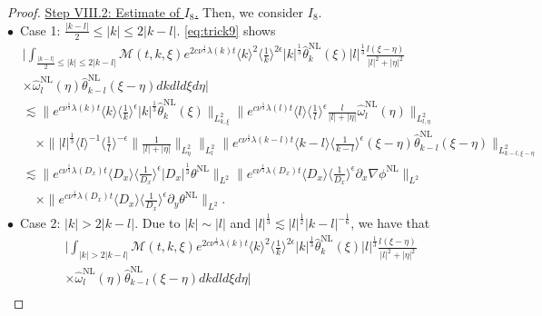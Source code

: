 \documentclass[reqno, 12pt]{amsart} %
\theoremstyle{plain} %
\theoremstyle{definition}
\theoremstyle{remark}
\numberwithin{equation}{section} %
\newcommand{\px}{\partial_x}
\newcommand{\py}{\partial_y}
\begin{document}
\begin{proof}
		\underline{ Step VIII.2: Estimate of $I_8$.} 
		Then,  we consider $I_8$.\\
		$\bullet$~Case 1:   $\frac{|k-l|}{2} \leq |k| \leq 2|k-l|$. \eqref{eq:trick9} shows
		\begin{align*}
			& \bigg| \int_{\frac{|k-l|}{2} \leq |k| \leq 2|k-l|} \mathcal{M}(t, k, \xi) e^{2 c \nu^{\frac{1}{3}} \lambda(k) t}\langle k\rangle^2\langle\frac{1}{k}\rangle^{2 \epsilon} |k|^\frac13\hat{\theta}_k^{\mathrm{NL}}(\xi) |l|^\frac13  \frac{l(\xi - \eta)}{|l|^2+|\eta|^2}  \\
			& \times \hat{\omega}_l^{\mathrm{NL}}(\eta) \hat{\theta}_{k-l}^{\mathrm{NL}}(\xi-\eta) d k d l d \xi d \eta \bigg| \\
			& \lesssim\|e^{c \nu^{\frac{1}{3}} \lambda(k) t}  \langle k \rangle \langle \frac1k \rangle^\epsilon |k|^\frac13  \hat{\theta}_k^{\mathrm{NL}}(\xi)\|_{L_{k, \xi}^2}   \|e^{c \nu^{\frac{1}{3}} \lambda(l) t}\langle l\rangle\langle\frac{1}{l}\rangle^\epsilon \frac l{|l| + |\eta|} \hat{\omega}_l^{\mathrm{NL}}(\eta)\|_{L_{l, \eta}^2}     \\
			& \quad \times \||l|^\frac13 \langle l\rangle^{-1}\langle\frac{1}{l}\rangle^{-\epsilon}\| \frac{1}{|l|+|\eta|}\|_{L_\eta^2}\|_{L_l^2} \|e^{c \nu^{\frac{1}{3}} \lambda(k-l) t}\langle k-l \rangle \langle \frac{1}{k-l} \rangle^\epsilon  (\xi - \eta) \hat{\theta}_{k-l}^{\mathrm{NL}}(\xi-\eta)\|_{L_{k-l, \xi-\eta}^2} \\
			& \lesssim\|e^{c \nu^{\frac{1}{3}} \lambda\left(D_x\right) t}\langle D_x\rangle    \langle \frac{1}{D_x}\rangle^\epsilon  \left|D_x\right|^{\frac{1}{3}} \theta^{\mathrm{NL}}\|_{L^2} \|e^{c \nu^{\frac{1}{3}} \lambda\left(D_x\right) t}\langle D_x\rangle\langle\frac{1}{D_x}\rangle^\epsilon\px \nabla \phi^{\mathrm{NL}}\|_{L^2} \\
			& \quad \times\|e^{c \nu^{\frac{1}{3}} \lambda\left(D_x\right) t}\langle D_x\rangle\langle\frac{1}{D_x}\rangle^\epsilon \py   \theta^{\mathrm{NL}}\|_{L^2}.
		\end{align*}
		$\bullet$~Case 2:   $|k| > 2|k-l| $. Due to $ |k|\sim |l|$ and $|l|^\frac13 \lesssim |l|^\frac12 |k-l|^{-\frac16}$,  we have that
		\begin{align*}
			& \bigg| \int_{|k| > 2|k-l| } \mathcal{M}(t, k, \xi) e^{2 c \nu^{\frac{1}{3}} \lambda(k) t}\langle k\rangle^2\langle\frac{1}{k}\rangle^{2 \epsilon} |k|^\frac13\hat{\theta}_k^{\mathrm{NL}}(\xi) |l|^\frac13  \frac{l(\xi - \eta)}{|l|^2+|\eta|^2}  \\
			& \times \hat{\omega}_l^{\mathrm{NL}}(\eta) \hat{\theta}_{k-l}^{\mathrm{NL}}(\xi-\eta) d k d l d \xi d \eta \bigg|\\

\end{align*}
\end{proof}
\end{document}

